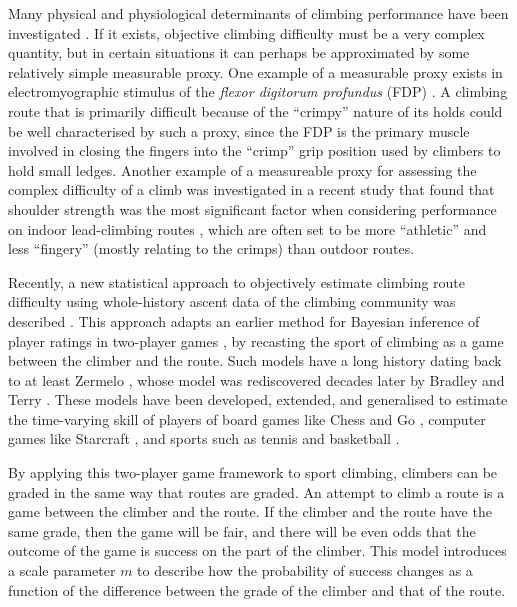 \documentclass{article}
\begin{document}
{Many physical and physiological determinants of climbing performance have been investigated \cite{balavs2012hand, balavs2014relationship, mackenzie2020physical}. If it exists, objective climbing difficulty must be a very complex quantity, but in certain situations it can perhaps be approximated by some relatively simple measurable proxy.  One example of a measurable proxy exists in electromyographic stimulus of the {\it flexor digitorum profundus} (FDP) \cite{delignieres1993psychophysical}.  A climbing route that is primarily difficult because of the ``crimpy'' nature of its holds could be well characterised by such a proxy, since the FDP is the primary muscle involved in closing the fingers into the ``crimp'' grip position used by climbers to hold small ledges.  Another example of a measureable proxy for assessing the complex difficulty of a climb was investigated in a recent study that found that shoulder strength was the most significant factor when considering performance on indoor lead-climbing routes \cite{mackenzie2020physical}, which are often set to be more ``athletic'' and less ``fingery'' (mostly relating to the crimps) than outdoor routes.

Recently, a new statistical approach to objectively estimate climbing route difficulty using whole-history ascent data of the climbing community was described \cite{scarff2020estimation}. This approach adapts an earlier method for Bayesian inference of player ratings in two-player games \cite{coulom2008whole}, by recasting the sport of climbing as a game between the climber and the route. Such models have a long history dating back to at least Zermelo \cite{zermelo1929berechnung}, whose model was rediscovered decades later by Bradley and Terry \cite{bradley1952rank}. These models have been developed, extended, and generalised to estimate the time-varying skill of players of board games like Chess \cite{Elo1978, glickman1999rating} and Go \cite{coulom2008whole}, computer games like Starcraft \cite{maystre2019pairwise}, and sports such as tennis \cite{maystre2019pairwise} and basketball \cite{maystre2019pairwise}.

By applying this two-player game framework to sport climbing, climbers can be graded in the same way that routes are graded. An attempt to climb a route is a game between the climber and the route. If the climber and the route have the same grade, then the game will be fair, and there will be even odds that the outcome of the game is success on the part of the climber. This model introduces a scale parameter $m$ to describe how the probability of success changes as a function of the difference between the grade of the climber and that of the route.

}
\end{document}
